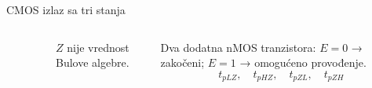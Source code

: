 \begin{frame}[label=09_3-s046]{CMOS izlaz sa tri stanja}
\begin{columns}[c,onlytextwidth]
\begin{center}

\end{center}
\begin{center}

\end{center}\begin{center}

\end{center}\alert{$Z$ nije vrednost Bulove algebre.}\par
Dva dodatna nMOS tranzistora: $E=0$ → zakočeni; $E=1$ → omogućeno provođenje.
\[t_{pLZ},\quad t_{pHZ},\quad t_{pZL},\quad t_{pZH}\]
\end{columns}
\end{frame}
